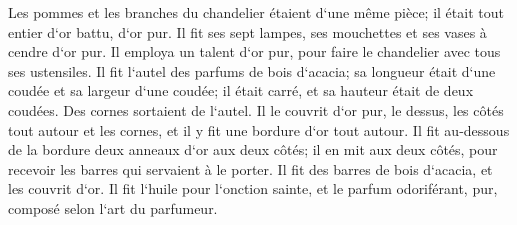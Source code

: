 \verse Les pommes et les branches du chandelier étaient d`une même pièce; il était tout entier d`or battu, d`or pur. 
\verse Il fit ses sept lampes, ses mouchettes et ses vases à cendre d`or pur. 
\verse Il employa un talent d`or pur, pour faire le chandelier avec tous ses ustensiles. 
\verse Il fit l`autel des parfums de bois d`acacia; sa longueur était d`une coudée et sa largeur d`une coudée; il était carré, et sa hauteur était de deux coudées. Des cornes sortaient de l`autel. 
\verse Il le couvrit d`or pur, le dessus, les côtés tout autour et les cornes, et il y fit une bordure d`or tout autour. 
\verse Il fit au-dessous de la bordure deux anneaux d`or aux deux côtés; il en mit aux deux côtés, pour recevoir les barres qui servaient à le porter. 
\verse Il fit des barres de bois d`acacia, et les couvrit d`or. 
\verse Il fit l`huile pour l`onction sainte, et le parfum odoriférant, pur, composé selon l`art du parfumeur. 

\chapter{}

